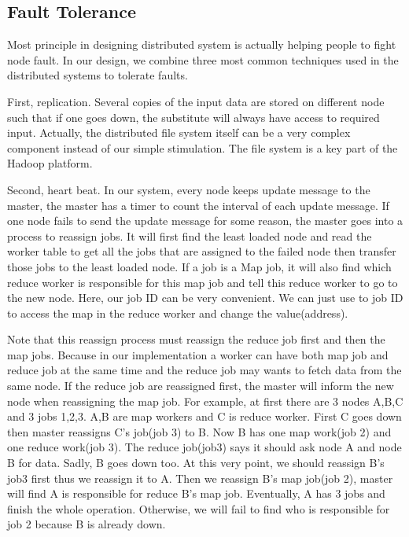 \documentclass[12pt]{article}
\begin{document}
\subsection{Fault Tolerance}

Most principle in designing distributed system is actually helping people to fight node fault. In our design, we combine three most common techniques used in the distributed systems to tolerate faults.

First, replication. Several copies of the input data are stored on different node such that if one goes down, the substitute will always have access to required input. Actually, the distributed file system itself can be a very complex component instead of our simple stimulation. The file system is a key part of the Hadoop platform.   

Second, heart beat. In our system, every node keeps update message to the master, the master has a timer to count the interval of each update message. If one node fails to send the update message for some reason, the master goes into a process to reassign jobs. It will first find the least loaded node and read the worker table to get all the jobs that are assigned to the failed node then transfer those jobs to the least loaded node. If a job is a Map job, it will also find which reduce worker is responsible for this map job and tell this reduce worker to go to the new node. Here, our job ID can be very convenient. We can just use to job ID to access the map in the reduce worker and change the value(address).
 
Note that this reassign process must reassign the reduce job first and then the map jobs. Because in our implementation a worker can have both map job and reduce job at the same time and the reduce job may wants to fetch data from the same node. If the reduce job are reassigned first, the master will inform the new node when reassigning the map job. For example, at first there are 3 nodes A,B,C and 3 jobs 1,2,3. A,B are map workers and C is reduce worker. First C goes down then master reassigns C's job(job 3) to B. Now B has one map work(job 2) and one reduce work(job 3). The reduce job(job3) says it should ask node A and node B for data. Sadly, B goes down too. At this very point, we should reassign B's job3 first thus we reassign it to A. Then we reassign B's map job(job 2), master will find A is responsible for reduce B's map job. Eventually, A has 3 jobs and finish the whole operation. Otherwise, we will fail to find who is responsible for job 2 because B is already down.
\end{document}
